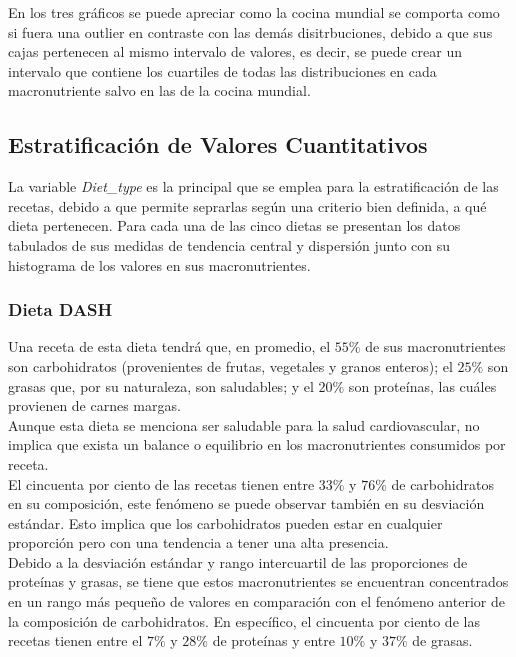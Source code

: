 \documentclass[12pt,a4paper]{article}
\begin{document}
        En los tres gráficos se puede apreciar como la cocina mundial se comporta 
        como si fuera una outlier en contraste con las demás disitrbuciones, debido 
        a que sus cajas pertenecen al mismo intervalo de valores, es decir, se puede 
        crear un intervalo que contiene los cuartiles de todas las distribuciones en 
        cada macronutriente salvo en las de la cocina mundial.

    \subsection{Estratificación de Valores Cuantitativos}

        La variable \emph{Diet\_type} es la principal que se emplea para la 
        estratificación de las recetas, debido a que permite seprarlas 
        según una criterio bien definida, a qué dieta pertenecen. Para cada 
        una de las cinco dietas se presentan los datos tabulados de sus 
        medidas de tendencia central y dispersión junto con su histograma 
        de los valores en sus macronutrientes.\\

        \subsubsection{Dieta DASH}

            Una receta de esta dieta tendrá que, en promedio, el $55\%$ de sus 
            macronutrientes son carbohidratos (provenientes de frutas, vegetales 
            y granos enteros); el $25\%$ son grasas que, por su naturaleza, son 
            saludables; y el $20\%$ son proteínas, las cuáles provienen de carnes margas.\\
            Aunque esta dieta se menciona ser saludable para la salud cardiovascular, 
            no implica que exista un balance o equilibrio en los macronutrientes 
            consumidos por receta.\\

            El cincuenta por ciento de las recetas tienen entre $33\%$ y $76\%$ 
            de carbohidratos en su composición, este fenómeno se puede observar 
            también	en su desviación estándar. Esto implica que los carbohidratos 
            pueden estar en cualquier proporción pero con una tendencia a tener 
            una alta presencia.\\

            Debido a la desviación estándar y rango intercuartil de las proporciones 
            de proteínas y grasas, se tiene que estos macronutrientes se encuentran 
            concentrados en un rango más pequeño de valores en comparación con el 
            fenómeno anterior de la composición de carbohidratos. En específico, el 
            cincuenta por ciento de las recetas tienen entre el $7\%$ y $28\%$ de 
            proteínas y entre $10\%$ y $37\%$ de grasas.
\end{document}
